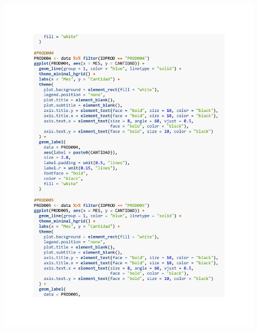 \begin{figure}[h!]
        \begin{tcolorbox}[colback=white, colframe=black, boxrule=1.5pt, sharp corners=all]
            {\includegraphics[width=\linewidth, height=22cm, trim=2.5cm 2.5cm 2.5cm 2.5cm, clip]{images/script8.pdf}}
        \end{tcolorbox}
\end{figure}


